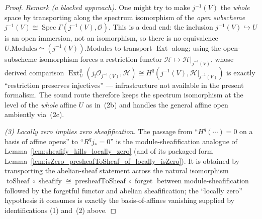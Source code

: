 \begin{proof}
  \textit{Remark (a blocked approach).} One might try to make \(j^{-1}(V)\) the \emph{whole} space by
  transporting along the spectrum isomorphism of the \emph{open subscheme}
  \(j^{-1}(V) \cong \operatorname{Spec}\Gamma(j^{-1}(V), \mathcal{O})\). This is a dead end: the
  inclusion \(j^{-1}(V) \hookrightarrow U\) is an open immersion, not an isomorphism, so there is no
  equivalence \(U.\mathrm{Modules} \simeq (j^{-1}(V)).\mathrm{Modules}\) to transport
  \(\operatorname{Ext}\) along; using the open-subscheme isomorphism forces a restriction functor
  \(\mathcal{H} \mapsto \mathcal{H}|_{j^{-1}(V)}\), whose derived comparison
  \(\operatorname{Ext}^q_{U}(j_!\mathcal{O}_{j^{-1}(V)}, \mathcal{H}) \cong H^q(j^{-1}(V),
  \mathcal{H}|_{j^{-1}(V)})\) is exactly ``restriction preserves injectives'' --- infrastructure not
  available in the present formalism. The sound route therefore keeps the spectrum isomorphism at the
  level of the \emph{whole} affine \(U\) as in~(2b) and handles the general affine open ambiently
  via~(2c).

  \emph{(3) Locally zero implies zero sheafification.} The
  passage from ``\(H^q(\cdots) = 0\) on a basis of affine opens'' to ``\(R^q j_* = 0\)'' is the
  module-sheafification analogue of Lemma~\ref{lem:sheafify_kills_locally_zero} (and of its packaged
  form Lemma~\ref{lem:isZero_presheafToSheaf_of_locally_isZero}). It is obtained by transporting the
  abelian-sheaf statement across the natural isomorphism
  \(\operatorname{toSheaf} \circ \operatorname{sheafify} \cong \operatorname{presheafToSheaf} \circ
  \operatorname{forget}\) between module-sheafification followed by the forgetful functor and abelian
  sheafification; the ``locally zero'' hypothesis it consumes is exactly the basis-of-affines vanishing
  supplied by identifications (1) and~(2) above.
\end{proof}

